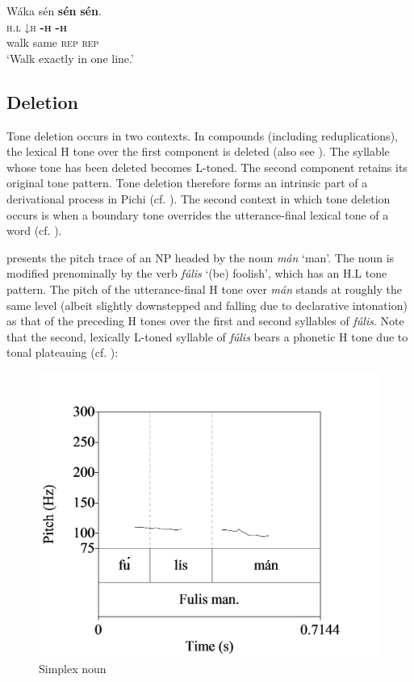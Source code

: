 \ea\label{ex:key:57}
\glll   Wáka  sén    \textbf{sén}    \textbf{sén}.\\
\textsc{h.l}    \textsc{↓}\textsc{h}    \textbf{\textsc{{}-h}}    \textbf{\textsc{{}-h}}\\
walk  same  \textsc{rep}    \textsc{rep}\\
\glt ‘Walk exactly in one line.’
\z
\subsection{Deletion}\label{sec:3.2.4}

Tone deletion occurs in two contexts. In compounds (including reduplications), the lexical H tone over the first component is deleted (also see \citealt{Yakpo2012}). The syllable whose tone has been deleted becomes L-toned. The second component retains its original tone pattern. Tone deletion therefore forms an intrinsic part of a derivational process in Pichi (cf. ). The second context in which tone deletion occurs is when a boundary tone overrides the utterance-final lexical tone of a word (cf.  ).

 presents the pitch trace of an NP headed by the noun \textit{mán} ‘man’. The noun is modified prenominally by the verb \textit{fúlis} ‘(be) foolish’, which has an H.L tone pattern. The pitch of the utterance-final H tone over \textit{mán} stands at roughly the same level (albeit slightly downstepped and falling due to declarative intonation) as that of the preceding H tones over the first and second syllables of \textit{fúlis}. Note that the second, lexically L-toned syllable of \textit{fúlis} bears a phonetic H tone due to tonal plateauing (cf. ):

\begin{figure}
\caption{Simplex noun}
\label{fig:key:3.19}
\includegraphics[height=.3\textheight]{figures/yakpomod-img21.png}
\end{figure}

